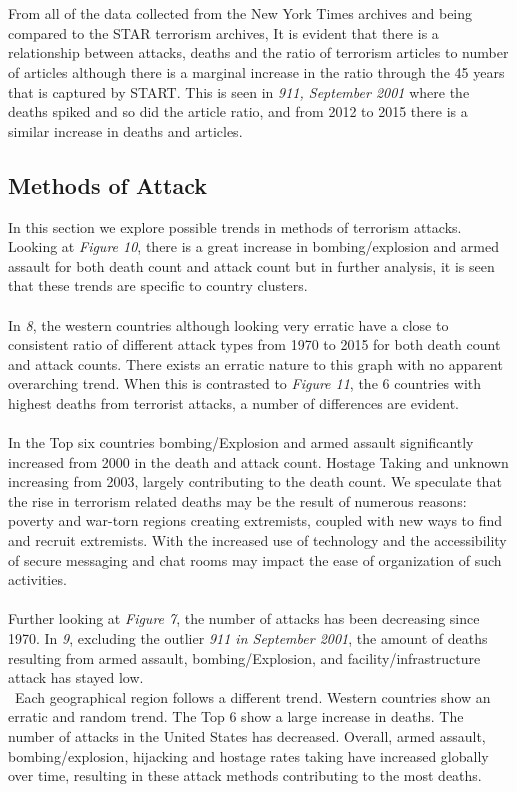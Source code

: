 \documentclass[10pt,a4paper]{article}
\begin{document}
\\\\ 
From all of the data collected from the New York Times archives and being compared to the STAR terrorism archives, It is evident that there is a relationship between attacks, deaths and the ratio of terrorism articles to number of articles although there is a marginal increase in the ratio through the 45 years that is captured by START. This is seen in \textit{911, September 2001} where the deaths spiked and so did the article ratio, and from 2012 to 2015 there is a similar increase in deaths and articles.



\subsection{Methods of Attack}
In this section we explore possible trends in methods of terrorism attacks. Looking at \textit{Figure 10}, there is a great increase in bombing/explosion and armed assault for both death count and attack count but in further analysis, it is seen that these trends are specific to country clusters.
\\\\
In \textit{8}, the western countries although looking very erratic have a close to consistent ratio of different attack types from 1970 to 2015 for both death count and attack counts. There exists an erratic nature to this graph with no apparent overarching trend. When this is contrasted to \textit{Figure 11}, the 6 countries with highest deaths from terrorist attacks, a number of differences are evident.
\\\\
In the Top six countries bombing/Explosion and armed assault significantly increased from 2000 in the death and attack count. Hostage Taking and unknown increasing from 2003, largely contributing to the death count. 
We speculate that the rise in terrorism related deaths may be the result of numerous reasons: poverty and war-torn regions creating extremists, coupled with new ways to find and recruit extremists. With the increased use of technology and the accessibility of secure messaging and chat rooms may impact the ease of organization of such activities.
\\\\
Further looking at \textit{Figure 7}, the number of attacks has been decreasing since 1970. In \textit{9}, excluding the outlier \textit{911 in September 2001}, the amount of deaths resulting from armed assault, bombing/Explosion, and facility/infrastructure attack  has stayed low.
\\\
Each geographical region follows a different trend. Western countries show an erratic and random trend. The Top 6 show a large increase in deaths. The number of attacks in the United States has decreased. Overall, armed assault, bombing/explosion, hijacking and hostage rates taking have increased globally over time, resulting in these attack methods contributing to the most deaths.
\end{document}
